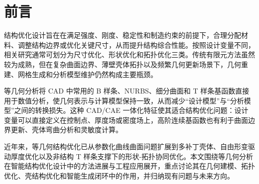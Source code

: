 \section{前言}

结构优化设计旨在在满足强度、刚度、稳定性和制造约束的前提下，合理分配材料、调整结构边界或优化关键尺寸，从而提升结构综合性能。按照设计变量不同，相关研究通常可划分为尺寸优化、形状优化和拓扑优化三类\cite{Wu2021SMO}。传统有限元方法虽然较为成熟，但在复杂曲面边界、薄壁壳体拓扑以及频繁几何更新场景下，几何重建、网格生成和分析模型维护仍然构成主要瓶颈。

等几何分析将 CAD 中常用的 B 样条、NURBS、细分曲面和 T 样条基函数直接用于数值分析，使几何表示与计算模型保持一致，从而减少“设计模型”与“分析模型”之间的转换损失\cite{Wang2021FMEReconstruction,Wen2024CompStructPHT,Liu2018CJSolid}。这种 CAD/CAE 一体化特征使其适合结构优化问题：设计变量可以直接定义在控制点、厚度场或密度场上，高阶连续基函数也有利于曲面边界更新、壳体弯曲分析和灵敏度计算。

近年来，等几何结构优化已从参数化曲线曲面问题扩展到多补丁壳体、自由形变驱动厚度优化以及非结构 T 样条支撑下的形状-拓扑协同优化\cite{Bandara2019ArXiv,Zhao2024EngComput,Wang2025CADA}。本文围绕等几何分析在智能结构优化设计中的方法进展与工程应用展开，重点讨论其在几何建模、拓扑优化、壳结构优化和智能生成闭环中的作用，并归纳现有问题与未来方向。
